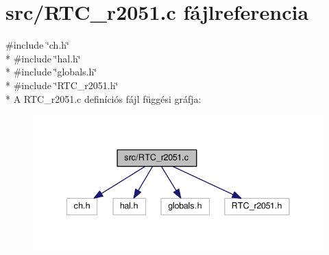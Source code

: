 \section{src/\-R\-T\-C\-\_\-r2051.c fájlreferencia}
\label{_r_t_c__r2051_8c}
{\ttfamily \#include \char`\"{}ch.\-h\char`\"{}}\\*
{\ttfamily \#include \char`\"{}hal.\-h\char`\"{}}\\*
{\ttfamily \#include \char`\"{}globals.\-h\char`\"{}}\\*
{\ttfamily \#include \char`\"{}R\-T\-C\-\_\-r2051.\-h\char`\"{}}\\*
A R\-T\-C\-\_\-r2051.\-c definíciós fájl függési gráfja\-:
\nopagebreak
\begin{figure}[H]
\begin{center}
\leavevmode
\includegraphics[width=337pt]{_r_t_c__r2051_8c__incl}
\end{center}
\end{figure}
